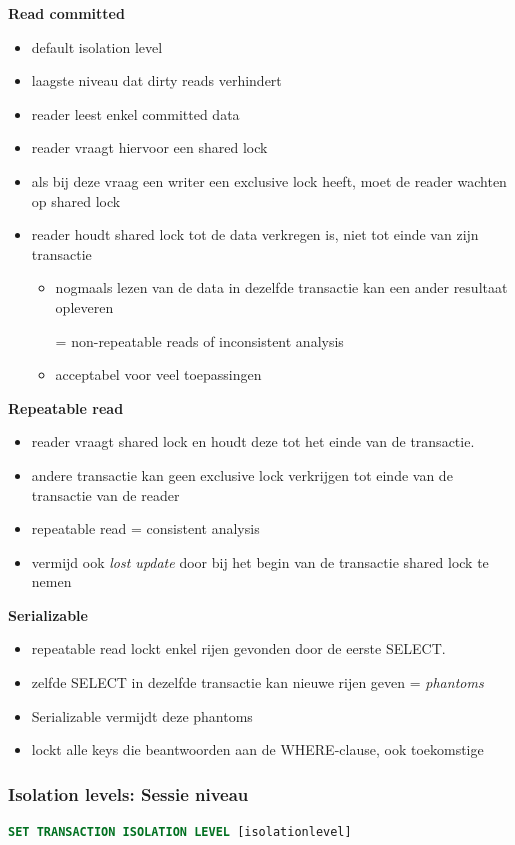 \documentclass[a4paper,12pt]{article}
\begin{document}
\textbf{Read committed}
\begin{itemize}
\item default isolation level
\item laagste niveau dat dirty reads verhindert
\item reader leest enkel committed data
\item reader vraagt hiervoor een shared lock
\item als bij deze vraag een writer een exclusive lock heeft, moet de reader wachten op shared lock
\item reader houdt shared lock tot de data verkregen is, niet tot einde van zijn transactie
	\begin{itemize}
	\item nogmaals lezen van de data in dezelfde transactie kan een ander resultaat opleveren
	
	= non-repeatable reads of inconsistent analysis
	\item acceptabel voor veel toepassingen
	\end{itemize}
\end{itemize}

\textbf{Repeatable read}
\begin{itemize}
\item reader vraagt shared lock en houdt deze tot het einde van de transactie.
\item andere transactie kan geen exclusive lock verkrijgen tot einde van de transactie van de reader
\item repeatable read = consistent analysis
\item vermijd ook \textit{lost update} door bij het begin van de transactie shared lock te nemen
\end{itemize}

\textbf{Serializable}
\begin{itemize}
\item repeatable read lockt enkel rijen gevonden door de eerste SELECT.
\item zelfde SELECT in dezelfde transactie kan nieuwe rijen geven = \textit{phantoms}
\item Serializable vermijdt deze phantoms
\item lockt alle keys die beantwoorden aan de WHERE-clause, ook toekomstige
\end{itemize}

\subsubsection{Isolation levels: Sessie niveau}
\begin{lstlisting}[language=sql, breaklines=true]
SET TRANSACTION ISOLATION LEVEL [isolationlevel]
\end{lstlisting}
\end{document}
